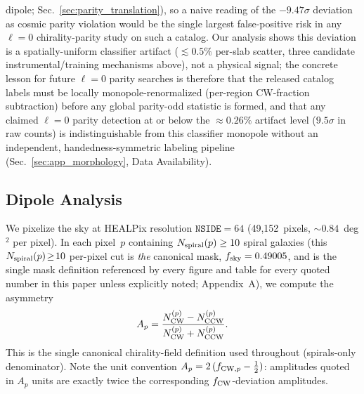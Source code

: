 \documentclass[aps,prd,twocolumn,superscriptaddress,preprintnumbers,nofootinbib,longbibliography,floatfix]{revtex4-2}
\newcommand{\nside}{\texttt{NSIDE}}
\newcommand{\sigmaunit}{\sigma}
\begin{document}
dipole; Sec.~\ref{sec:parity_translation}), so a naive reading of the $-9.47\sigmaunit$ deviation as cosmic parity violation would be the single largest false-positive risk in any $\ell\!=\!0$ chirality-parity study on such a catalog. Our analysis shows this deviation is a spatially-uniform classifier artifact ($\lesssim\!0.5\%$ per-slab scatter, three candidate instrumental/training mechanisms above), not a physical signal; the concrete lesson for future $\ell\!=\!0$ parity searches is therefore that the released catalog labels must be locally monopole-renormalized (per-region CW-fraction subtraction) before any global parity-odd statistic is formed, and that any claimed $\ell\!=\!0$ parity detection at or below the $\approx\!0.26\%$ artifact level ($9.5\sigmaunit$ in raw counts) is indistinguishable from this classifier monopole without an independent, handedness-symmetric labeling pipeline (Sec.~\ref{sec:app_morphology}, Data Availability).

\subsection{Dipole Analysis}
\label{sec:dipole}

We pixelize the sky at HEALPix resolution $\nside = 64$ (49,152~pixels, $\sim\!0.84$~deg$^2$ per pixel). In each pixel~$p$ containing $N_{\rm spiral}(p) \geq 10$ spiral galaxies (this $N_{\rm spiral}(p)\!\ge\!10$ per-pixel cut is \emph{the} canonical mask, $f_{\rm sky}=0.49005$, and is the single mask definition referenced by every figure and table for every quoted number in this paper unless explicitly noted; Appendix~A), we compute the asymmetry
\begin{equation}
A_p = \frac{N_{\rm CW}^{(p)} - N_{\rm CCW}^{(p)}}{N_{\rm CW}^{(p)} + N_{\rm CCW}^{(p)}}.
\label{eq:ap_def}
\end{equation}
This is the single canonical chirality-field definition used throughout (spirals-only denominator). Note the unit convention $A_p = 2\,(f_{{\rm CW},p}-\tfrac12)$: amplitudes quoted in $A_p$ units are exactly twice the corresponding $f_{\rm CW}$-deviation amplitudes.
\end{document}
